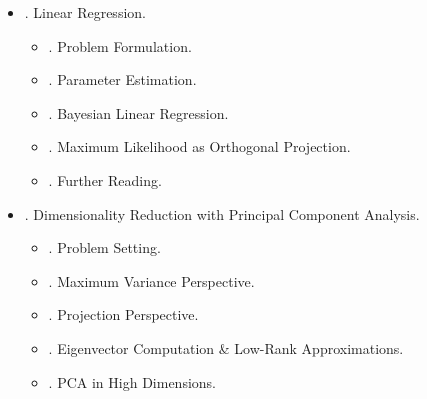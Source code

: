 \documentclass{article}
\newtheorem{remark}{Remark}
\begin{document}
\begin{itemize}
\begin{itemize}
\begin{itemize}
			Despite these challenges, Bayesian inference has been successfully applied to a variety of problems, including large-scale topic modeling(Hoffman et al., 2013), click-through-rate prediction (Graepel et al., 2010), data-efficient reinforcement learning in control systems (Deisenroth et al., 2015), online ranking systems (Herbrich et al., 2007), \& large-scale recommender systems. There are generic tools, e.g. Bayesian optimization (Brochu et al., 2009; Snoek et al., 2012; Shahriari et al., 2016), that are very useful ingredients for an efficient search of meta parameters of models or algorithms.
			\begin{remark}
				In ML literature, there can be a somewhat arbitrary separation between (random) ``variables'' \& ``parameters''. While parameters are estimated (e.g., via maximum likelihood), variables are usually marginalized out. In this book, not so strict with this separation because, in principle, can replace a prior on any parameter \& integrate it out, which would then turn parameter into a random variable according to aforementioned separation.
			\end{remark}
		\end{itemize}
		\item {. Directed Graphical Models.}
		\item {. Model Selection.}
	\end{itemize}
	\item {. Linear Regression.}
	\begin{itemize}
		\item {. Problem Formulation.}
		\item {. Parameter Estimation.}
		\item {. Bayesian Linear Regression.}
		\item {. Maximum Likelihood as Orthogonal Projection.}
		\item {. Further Reading.}
	\end{itemize}
	\item {. Dimensionality Reduction with Principal Component Analysis.}
	\begin{itemize}
		\item {. Problem Setting.}
		\item {. Maximum Variance Perspective.}
		\item {. Projection Perspective.}
		\item {. Eigenvector Computation \& Low-Rank Approximations.}
		\item {. PCA in High Dimensions.}

\end{itemize}
\end{itemize}
\end{document}
